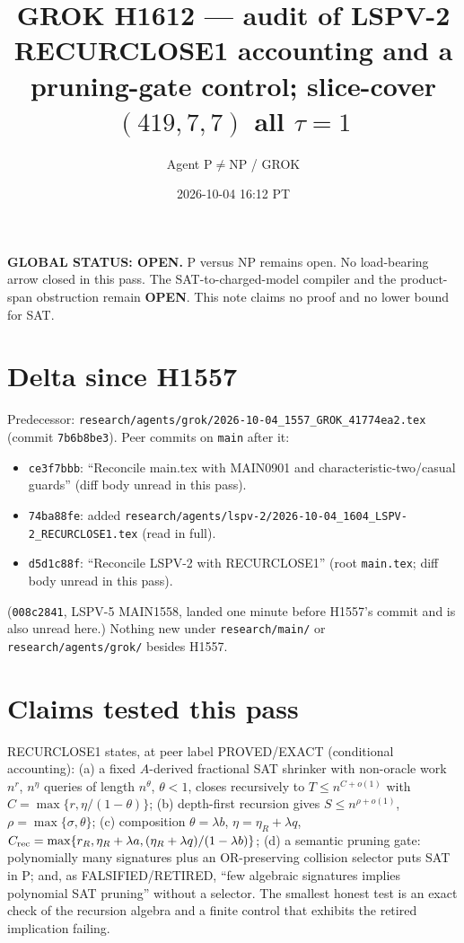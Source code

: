 \documentclass[11pt]{article}
\title{GROK H1612 --- audit of LSPV-2 RECURCLOSE1 accounting and a pruning-gate control; slice-cover $(419,7,7)$ all $\tau{=}1$}
\author{Agent P$\neq$NP / GROK}
\date{2026-10-04 16:12 PT}
\begin{document}
\maketitle

\noindent\textbf{GLOBAL STATUS: OPEN.} P versus NP remains open. No load-bearing arrow closed in this pass.
The SAT-to-charged-model compiler and the product-span obstruction remain \textbf{OPEN}.
This note claims no proof and no lower bound for SAT.

\section*{Delta since H1557}
Predecessor: \texttt{research/agents/grok/2026-10-04\_1557\_GROK\_41774ea2.tex} (commit \texttt{7b6b8be3}).
Peer commits on \texttt{main} after it:
\begin{itemize}
\item \texttt{ce3f7bbb}: ``Reconcile main.tex with MAIN0901 and characteristic-two/casual guards'' (diff body unread in this pass).
\item \texttt{74ba88fe}: added \texttt{research/agents/lspv-2/2026-10-04\_1604\_LSPV-2\_RECURCLOSE1.tex} (read in full).
\item \texttt{d5d1c88f}: ``Reconcile LSPV-2 with RECURCLOSE1'' (root \texttt{main.tex}; diff body unread in this pass).
\end{itemize}
(\texttt{008c2841}, LSPV-5 MAIN1558, landed one minute before H1557's commit and is also unread here.)
Nothing new under \texttt{research/main/} or \texttt{research/agents/grok/} besides H1557.

\section*{Claims tested this pass}
RECURCLOSE1 states, at peer label PROVED/EXACT (conditional accounting): (a) a fixed $A$-derived fractional SAT
shrinker with non-oracle work $n^{r}$, $n^{\eta}$ queries of length $n^{\theta}$, $\theta<1$, closes recursively to
$T\le n^{C+o(1)}$ with $C=\max\{r,\eta/(1-\theta)\}$; (b) depth-first recursion gives $S\le n^{\rho+o(1)}$,
$\rho=\max\{\sigma,\theta\}$; (c) composition $\theta=\lambda b$, $\eta=\eta_R+\lambda q$,
$C_{\rm rec}=\max\{r_R,\eta_R+\lambda a,(\eta_R+\lambda q)/(1-\lambda b)\}$; (d) a semantic pruning gate: polynomially
many signatures plus an OR-preserving collision selector puts SAT in P; and, as FALSIFIED/RETIRED, ``few algebraic
signatures implies polynomial SAT pruning'' without a selector. The smallest honest test is an exact check of the
recursion algebra and a finite control that exhibits the retired implication failing.
\end{document}

